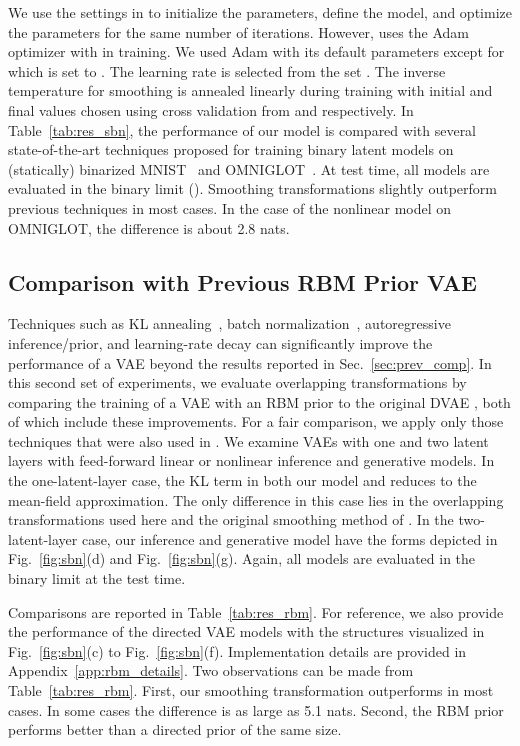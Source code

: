 \documentclass{article}
\begin{document}
We use the settings in \cite{tucker2017rebar} to initialize the parameters, define the model,
and optimize the parameters for the same number of iterations. However, 
\cite{tucker2017rebar} uses the Adam optimizer with  in training. We used Adam with its default parameters except for  which is set to . The learning rate is selected from the set . The inverse temperature  for smoothing is annealed linearly during training with initial and final values chosen using cross validation from  and 
 respectively. In Table~\ref{tab:res_sbn}, the performance of our model is compared
with several state-of-the-art techniques proposed for training
binary latent models on (statically) binarized MNIST~\cite{salakhutdinov2008dbn} and OMNIGLOT~\cite{lake2015human}. At test time, all models are evaluated in the binary limit ().
Smoothing transformations slightly outperform previous techniques in most cases. In the case of the nonlinear model on OMNIGLOT, the difference is about 2.8 nats. 

\subsection{Comparison with Previous RBM Prior VAE} \label{sec:prev_vae}

Techniques such as KL annealing~\cite{sonderby2016ladder}, batch normalization~\cite{ioffe2015batch}, 
autoregressive inference/prior, and learning-rate decay can significantly improve the performance of a VAE beyond the results reported in Sec.~\ref{sec:prev_comp}.
In this second set of experiments, we evaluate overlapping transformations by comparing the training of a VAE with an RBM prior to the original DVAE \cite{rolfe2016discrete}, both of which include these improvements. 
For a fair comparison, we apply only those techniques that were also used in \cite{rolfe2016discrete}. We examine VAEs with one and two latent layers with feed-forward linear or nonlinear 
inference and generative models. In the one-latent-layer case, the KL term in both our model and \cite{rolfe2016discrete}
reduces to the mean-field approximation.
The only difference in this case lies in the overlapping 
transformations used here and the original smoothing method of \cite{rolfe2016discrete}. 
In the two-latent-layer case, our inference and generative model have the forms depicted in Fig.~\ref{fig:sbn}(d) and Fig.~\ref{fig:sbn}(g).
Again, all models are evaluated in the binary limit at the test time.

Comparisons are reported in Table~\ref{tab:res_rbm}.
For reference, we also provide the performance of the directed VAE models with 
the structures visualized in Fig.~\ref{fig:sbn}(c) to Fig.~\ref{fig:sbn}(f).
Implementation details are provided in Appendix~\ref{app:rbm_details}. 
Two observations can be made from Table~\ref{tab:res_rbm}. First, our smoothing transformation 
outperforms \cite{rolfe2016discrete} in most cases. In some cases the difference is as 
large as 5.1 nats. Second, the RBM prior performs better than a directed prior of the same size. 
\end{document}

